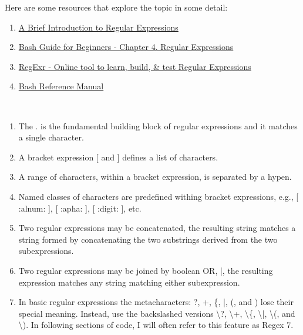 Here are some resources that explore the topic in some detail:

\begin{enumerate}
	\item{\href{http://tldp.org/LDP/abs/html/x17129.html}{A Brief Introduction to Regular Expressions}}
	\item{\href{http://tldp.org/LDP/Bash-Beginners-Guide/html/chap\_04.html}{Bash Guide for Beginners - Chapter 4. Regular Expressions}}
	\item{\href{http://regexr.com/}{RegExr - Online tool to learn, build, \& test Regular Expressions}}
	\item{\href{https://www.gnu.org/software/bash/manual/bashref.html}{Bash Reference Manual}}	
\end{enumerate}
	
\\

\begin{enumerate}
	\item{The . is the fundamental building block of regular expressions and it matches a single character.}
	\item{A bracket expression [ and ] defines a list of characters.}
	\item{A range of characters, within a bracket expression, is separated by a hypen.}
	\item{Named classes of characters are predefined withing bracket expressions, e.g., [ :alnum: ], [ :apha: ], [ :digit: ], etc.}
	\item{Two regular expressions may be concatenated, the resulting string matches a string formed by concatenating the two substrings derived from the two subexpressions.}
	\item{Two regular expressions may be joined by boolean OR, |, the resulting expression matches any string matching either subexpression.}
	\item{In basic regular expressions the metacharacters: ?, +, \{, |, (, and ) lose their special meaning. Instead, use the backslashed versions \textbackslash{}?, \textbackslash{}+, \textbackslash{}\{, \textbackslash{}|, \textbackslash{}(, and \textbackslash{}).} In following sections of code, I will often refer to this feature as Regex 7.
\end{enumerate}

\\

